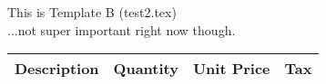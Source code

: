 \documentclass{article}
\begin{document}
\centering
This is Template B (test2.tex)\\
...not super important right now though.

\begin{table}[h]
\centering
\begin{tabular}{cccc}

\hline
Description & Quantity & Unit Price & Tax \\
\hline
\end{tabular}
\end{table}
\end{document}
